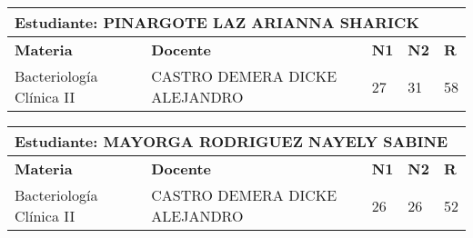 \small
\begin{tabularx}{\textwidth}{|p{5cm}|p{7cm}|X|X|X|}
\hline
\multicolumn{5}{|p{\dimexpr\textwidth-2\tabcolsep-2\arrayrulewidth}|}{\textbf{Estudiante: PINARGOTE LAZ ARIANNA SHARICK }}\\\hline
\textbf{Materia} & \textbf{Docente} & \textbf{N1} & \textbf{N2} & \textbf{R} \\ \hline
Bacteriología Clínica II & CASTRO DEMERA DICKE ALEJANDRO  & 27 & 31& 58 \\ \hline
\end{tabularx}\vspace{10mm}
\small
\begin{tabularx}{\textwidth}{|p{5cm}|p{7cm}|X|X|X|}
\hline
\multicolumn{5}{|p{\dimexpr\textwidth-2\tabcolsep-2\arrayrulewidth}|}{\textbf{Estudiante: MAYORGA RODRIGUEZ NAYELY SABINE }}\\\hline
\textbf{Materia} & \textbf{Docente} & \textbf{N1} & \textbf{N2} & \textbf{R} \\ \hline
Bacteriología Clínica II & CASTRO DEMERA DICKE ALEJANDRO  & 26 & 26& 52 \\ \hline
\end{tabularx}\vspace{10mm}

